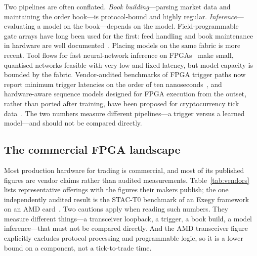 Two pipelines are often conflated. \emph{Book building}---parsing market data and maintaining the
order book---is protocol-bound and highly regular. \emph{Inference}---evaluating a model on the
book---depends on the model. Field-programmable gate arrays have long been used for the first:
feed handling and book maintenance in hardware are well documented~\citep{leber2011,lockwood2012}.
Placing models on the same fabric is more recent. Tool flows for fast neural-network inference on
FPGAs~\citep{hls4ml} make small, quantised networks feasible with very low and fixed latency,
but model capacity is bounded by the fabric. Vendor-audited benchmarks of FPGA trigger paths now
report minimum trigger latencies on the order of ten nanoseconds~\citep{exegy_stac2024}, and
hardware-aware sequence models designed for FPGA execution from the outset, rather than ported after
training, have been proposed for cryptocurrency tick data~\citep{popov2026ssm}. The two numbers
measure different pipelines---a trigger versus a learned model---and should not be compared
directly.

\subsection{The commercial FPGA landscape}

Most production hardware for trading is commercial, and most of its published figures are vendor
claims rather than audited measurements. Table~\ref{tab:vendors} lists representative offerings with
the figures their makers publish; the one independently audited result is the STAC-T0 benchmark of
an Exegy framework on an AMD card~\citep{exegy_stac2024}. Two cautions apply when reading such
numbers. They measure different things---a transceiver loopback, a trigger, a book build, a model
inference---that must not be compared directly. And the AMD transceiver figure explicitly excludes
protocol processing and programmable logic, so it is a lower bound on a component, not a
tick-to-trade time.

